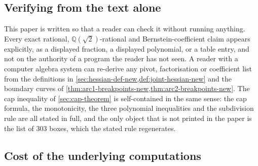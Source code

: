 \documentclass[11pt,reqno]{amsart}
\renewcommand{\_}{\origunderscore\allowbreak}
\numberwithin{equation}{section}
\theoremstyle{plain}
\theoremstyle{definition}
\theoremstyle{remark}
\begin{document}
\subsection{Verifying from the text alone}

This paper is written so that a reader can check it without running
anything. Every exact rational, $\mathbb{Q}(\sqrt2)$-rational and
Bernstein-coefficient claim appears explicitly, as a displayed fraction,
a displayed polynomial, or a table entry, and not on the authority of a program the reader has not seen. A reader with a computer algebra
system can re-derive any pivot, factorisation or coefficient list from
the definitions in
\cref{sec:hessian-def-new,def:joint-hessian-new} and the boundary curves
of \cref{thm:arc1-breakpoints-new,thm:arc2-breakpoints-new}. The cap
inequality of \cref{sec:cap-theorem} is self-contained in the same
sense: the cap formula, the monotonicity, the three polynomial
inequalities and the subdivision rule are all stated in full, and the
only object that is not printed in the paper is the list of $303$ boxes,
which the stated rule regenerates.

\subsection{Cost of the underlying computations}
\end{document}
